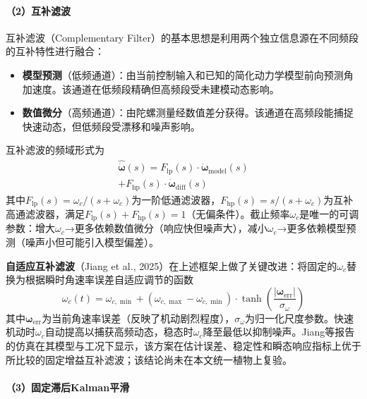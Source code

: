 \paragraph{（2）互补滤波}

互补滤波（Complementary Filter）的基本思想是利用两个独立信息源在不同频段的互补特性进行融合\cite{jiang2025adaptive}：
\begin{itemize}
    \item \textbf{模型预测}（低频通道）：由当前控制输入和已知的简化动力学模型前向预测角加速度。该通道在低频段精确但高频段受未建模动态影响。
    \item \textbf{数值微分}（高频通道）：由陀螺测量经数值差分获得。该通道在高频段能捕捉快速动态，但低频段受漂移和噪声影响。
\end{itemize}

互补滤波的频域形式为
\begin{multline}
    \hat{\dot{\boldsymbol{\omega}}}(s) = F_{\mathrm{lp}}(s) \cdot \dot{\boldsymbol{\omega}}_{\text{model}}(s) \\
    + F_{\mathrm{hp}}(s) \cdot \dot{\boldsymbol{\omega}}_{\text{diff}}(s)
    \label{eq:comp_filter_freq}
\end{multline}
其中$F_{\mathrm{lp}}(s) = \omega_c/(s+\omega_c)$为一阶低通滤波器，$F_{\mathrm{hp}}(s) = s/(s+\omega_c)$为互补高通滤波器，满足$F_{\mathrm{lp}}(s) + F_{\mathrm{hp}}(s) = 1$（无偏条件）。截止频率$\omega_c$是唯一的可调参数：增大$\omega_c$→更多依赖数值微分（响应快但噪声大），减小$\omega_c$→更多依赖模型预测（噪声小但可能引入模型偏差）。

\textbf{自适应互补滤波}（Jiang et al., 2025）\cite{jiang2025adaptive}在上述框架上做了关键改进：将固定的$\omega_c$替换为根据瞬时角速率误差自适应调节的函数
\begin{equation}
    \omega_c(t) = \omega_{c,\min} + (\omega_{c,\max} - \omega_{c,\min}) \cdot \tanh\left(\frac{|\boldsymbol{\omega}_{\text{err}}|}{\sigma_\omega}\right)
    \label{eq:adaptive_cf}
\end{equation}
其中$\boldsymbol{\omega}_{\text{err}}$为当前角速率误差（反映了机动剧烈程度），$\sigma_\omega$为归一化尺度参数。快速机动时$\omega_c$自动提高以捕获高频动态，稳态时$\omega_c$降至最低以抑制噪声。Jiang等报告的仿真在其模型与工况下显示，该方案在估计误差、稳定性和瞬态响应指标上优于所比较的固定增益互补滤波\cite{jiang2025adaptive}；该结论尚未在本文统一植物上复验。

\paragraph{（3）固定滞后Kalman平滑}

